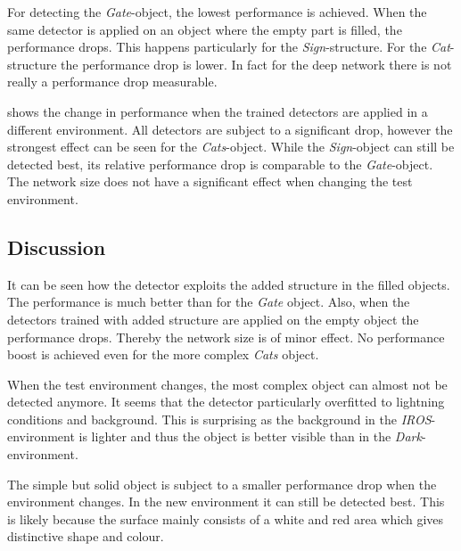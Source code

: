 For detecting the \textit{Gate}-object, the lowest performance is achieved. When the same detector is applied on an object where the empty part is filled, the performance drops. This happens particularly for the \textit{Sign}-structure. For the \textit{Cat}-structure the performance drop is lower. In fact for the deep network there is not really a performance drop measurable.

\begin{table}
	\centering
	
	\caption{Change in performance when the detectors are tested in another environment than their training environment. The most severe drop can be seen at the \textit{Cats}-object. The drop for \acp{EWFO} is comparable to the \textit{Sign}-object}
	\label{tab:diff_iros}
\end{table}

 shows the change in performance when the trained detectors are applied in a different environment. All detectors are subject to a significant drop, however the strongest effect can be seen for the \textit{Cats}-object. While the \textit{Sign}-object can still be detected best, its relative performance drop is comparable to the \textit{Gate}-object. The network size does not have a significant effect when changing the test environment.

\subsection{Discussion}

It can be seen how the detector exploits the added structure in the filled objects. The performance is much better than for the \textit{Gate} object. Also, when the detectors trained with added structure are applied on the empty object the performance drops. Thereby the network size is of minor effect. No performance boost is achieved even for the more complex \textit{Cats} object.

When the test environment changes, the most complex object can almost not be detected anymore. It seems that the detector particularly overfitted to lightning conditions and background. This is surprising as the background in the \textit{IROS}-environment is lighter and thus the object is better visible than in the \textit{Dark}-environment.

The simple but solid object is subject to a smaller performance drop when the environment changes. In the new environment it can still be detected best. This is likely because the surface mainly consists of a white and red area which gives distinctive shape and colour.

